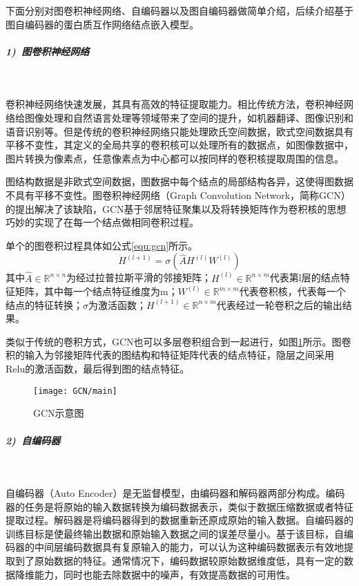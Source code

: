下面分别对图卷积神经网络、自编码器以及图自编码器做简单介绍，后续介绍基于图自编码器的蛋白质互作网络结点嵌入模型。

\subparagraph{1)~图卷积神经网络} ~

卷积神经网络快速发展，其具有高效的特征提取能力。相比传统方法，卷积神经网络给图像处理和自然语言处理等领域带来了空间的提升，如机器翻译、图像识别和语音识别等。但是传统的卷积神经网络只能处理欧氏空间数据，欧式空间数据具有平移不变性，其定义的全局共享的卷积核可以处理所有的数据点，如图像数据中，图片转换为像素点，任意像素点为中心都可以按同样的卷积核提取周围的信息。

图结构数据是非欧式空间数据，图数据中每个结点的局部结构各异，这使得图数据不具有平移不变性。图卷积神经网络（Graph Convolution Network，简称GCN）的提出\cite{kipf_semi-supervised_2017}解决了该缺陷，GCN基于邻居特征聚集以及将转换矩阵作为卷积核的思想巧妙的实现了在每一个结点做相同卷积过程。

单个的图卷积过程具体如公式\ref{equ:gcn}所示。
\begin{equation}
    \label{equ:gcn}
    H^{(l+1)}=\sigma (\hat{A}H^{(l)}W^{(l)})
\end{equation}
其中$\hat{A}\in \mathbb{R}^{n\times n} $为经过拉普拉斯平滑的邻接矩阵；$H^{(l)}\in \mathbb{R}^{n\times m} $代表第l层的结点特征矩阵，其中每一个结点特征维度为m；$W^{(l)}\in \mathbb{R}^{m\times m} $代表卷积核，代表每一个结点的特征转换；$\sigma $为激活函数；$H^{(l+1)}\in \mathbb{R}^{n\times m} $代表经过一轮卷积之后的输出结果。

类似于传统的卷积方式，GCN也可以多层卷积组合到一起进行，如图\ref{fig:GCN/main}所示。图卷积的输入为邻接矩阵代表的图结构和特征矩阵代表的结点特征，隐层之间采用Relu的激活函数，最后得到图的结点特征。

\begin{figure}[htbp]
    \centering
    \texttt{[image: GCN/main]}
    \caption{GCN示意图\cite{wu_comprehensive_2020}}
    \label{fig:GCN/main}
\end{figure}

\subparagraph{2)~自编码器} ~

自编码器（Auto Encoder）是无监督模型，由编码器和解码器两部分构成。编码器的任务是将原始的输入数据转换为编码数据表示，类似于数据压缩数据或者特征提取过程。解码器是将编码器得到的数据重新还原成原始的输入数据。自编码器的训练目标是使最终输出数据和原始输入数据之间的误差尽量小。基于该目标，自编码器的中间层编码数据具有复原输入的能力，可以认为这种编码数据表示有效地提取到了原始数据的特征。通常情况下，编码数据较原始数据维度低，具有一定的数据降维能力，同时也能去除数据中的噪声，有效提高数据的可用性。

